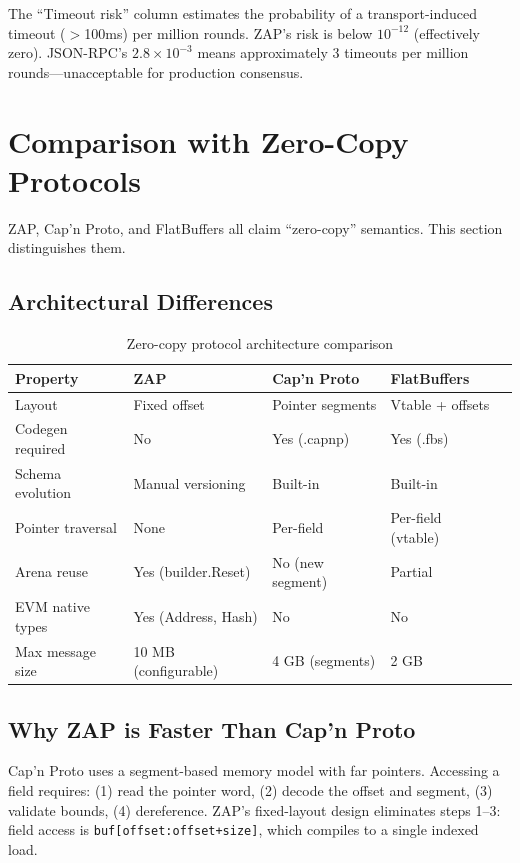 \documentclass[11pt,letterpaper]{article}
\begin{document}
The ``Timeout risk'' column estimates the probability of a transport-induced timeout ($>$100ms) per million rounds. ZAP's risk is below $10^{-12}$ (effectively zero). JSON-RPC's $2.8 \times 10^{-3}$ means approximately 3 timeouts per million rounds---unacceptable for production consensus.

\section{Comparison with Zero-Copy Protocols}

ZAP, Cap'n Proto, and FlatBuffers all claim ``zero-copy'' semantics. This section distinguishes them.

\subsection{Architectural Differences}

\begin{table}[h]
\centering
\caption{Zero-copy protocol architecture comparison}
\label{tab:zerocopy}
\begin{tabular}{lllll}
\toprule
\textbf{Property} & \textbf{ZAP} & \textbf{Cap'n Proto} & \textbf{FlatBuffers} \\
\midrule
Layout & Fixed offset & Pointer segments & Vtable + offsets \\
Codegen required & No & Yes (.capnp) & Yes (.fbs) \\
Schema evolution & Manual versioning & Built-in & Built-in \\
Pointer traversal & None & Per-field & Per-field (vtable) \\
Arena reuse & Yes (builder.Reset) & No (new segment) & Partial \\
EVM native types & Yes (Address, Hash) & No & No \\
Max message size & 10 MB (configurable) & 4 GB (segments) & 2 GB \\
\bottomrule
\end{tabular}
\end{table}

\subsection{Why ZAP is Faster Than Cap'n Proto}

Cap'n Proto uses a segment-based memory model with far pointers. Accessing a field requires: (1) read the pointer word, (2) decode the offset and segment, (3) validate bounds, (4) dereference. ZAP's fixed-layout design eliminates steps 1--3: field access is \texttt{buf[offset:offset+size]}, which compiles to a single indexed load.
\end{document}
